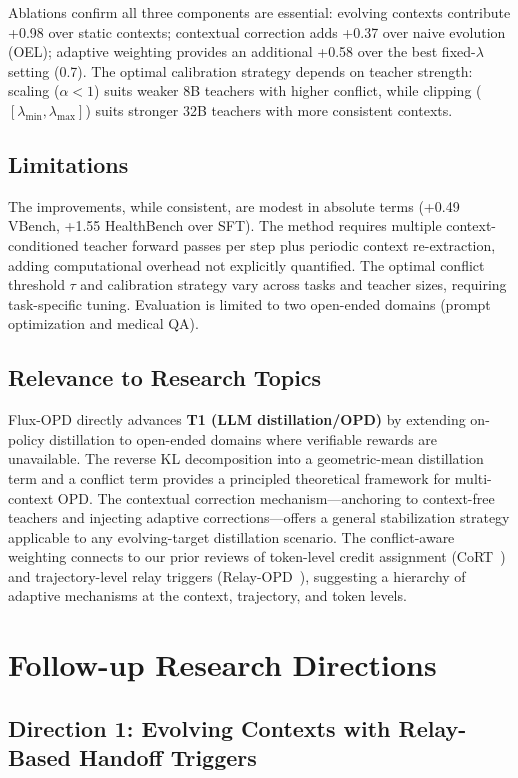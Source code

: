 \documentclass[11pt,a4paper]{article}
\begin{document}
Ablations confirm all three components are essential: evolving contexts contribute +0.98 over static contexts; contextual correction adds +0.37 over naive evolution (OEL); adaptive weighting provides an additional +0.58 over the best fixed-$\lambda$ setting (0.7). The optimal calibration strategy depends on teacher strength: scaling ($\alpha < 1$) suits weaker 8B teachers with higher conflict, while clipping ($[\lambda_{\min}, \lambda_{\max}]$) suits stronger 32B teachers with more consistent contexts.

\subsection{Limitations}
The improvements, while consistent, are modest in absolute terms (+0.49 VBench, +1.55 HealthBench over SFT). The method requires multiple context-conditioned teacher forward passes per step plus periodic context re-extraction, adding computational overhead not explicitly quantified. The optimal conflict threshold $\tau$ and calibration strategy vary across tasks and teacher sizes, requiring task-specific tuning. Evaluation is limited to two open-ended domains (prompt optimization and medical QA).

\subsection{Relevance to Research Topics}
Flux-OPD directly advances \textbf{T1 (LLM distillation/OPD)} by extending on-policy distillation to open-ended domains where verifiable rewards are unavailable. The reverse KL decomposition into a geometric-mean distillation term and a conflict term provides a principled theoretical framework for multi-context OPD. The contextual correction mechanism---anchoring to context-free teachers and injecting adaptive corrections---offers a general stabilization strategy applicable to any evolving-target distillation scenario. The conflict-aware weighting connects to our prior reviews of token-level credit assignment (CoRT~\cite{cort2026}) and trajectory-level relay triggers (Relay-OPD~\cite{relayopd2026}), suggesting a hierarchy of adaptive mechanisms at the context, trajectory, and token levels.

\section{Follow-up Research Directions}

\subsection{Direction 1: Evolving Contexts with Relay-Based Handoff Triggers}
\end{document}
